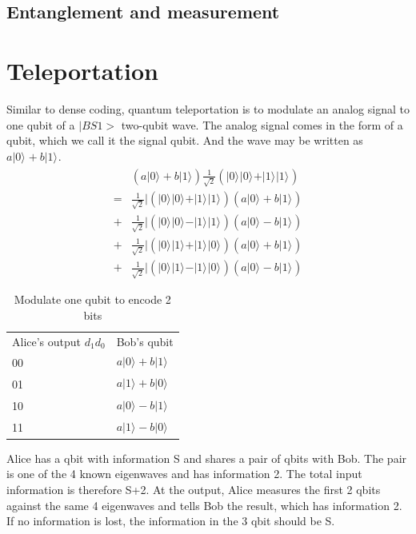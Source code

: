 \documentclass{book}
\newcommand{\keta}[2][]{\vert {#2} \rangle_{#1}}
\begin{document}
\subsection{Entanglement and measurement}

\section{Teleportation}
Similar to dense coding, quantum teleportation is to modulate an analog signal to one qubit of a $|BS1>$ two-qubit wave. The analog signal comes in the form of a qubit, which we call it the signal qubit. And the wave may be written as $a \keta{0} + b\keta{1}$.
\begin{equation}\label{}
\begin{array}{rl}
    & (a \keta{0} + b\keta{1}) \frac 1 {\sqrt 2}(\keta{0}\keta{0}+\keta{1}\keta{1}) \\
    = & \frac 1 {\sqrt 2}| (\keta{0}\keta{0}+\keta{1}\keta{1}) (a \keta{0} + b\keta{1}) \\
    +& \frac 1 {\sqrt 2}| (\keta{0}\keta{0}-\keta{1}\keta{1}) (a \keta{0} - b\keta{1}) \\
    +& \frac 1 {\sqrt 2}| (\keta{0}\keta{1}+\keta{1}\keta{0}) (a \keta{0} + b\keta{1}) \\
    +& \frac 1 {\sqrt 2}| (\keta{0}\keta{1}-\keta{1}\keta{0}) (a \keta{0} - b\keta{1})
\end{array}
\end{equation}

\begin{table}[]
\caption{Modulate one qubit to encode 2 bits}
\label{TeleportationTable}
\begin{tabular}{ll}
Alice's output $d_1 d_0$ & Bob's qubit  \\
00 & $a\keta{0}+b\keta{1}$ \\
01 & $a\keta{1}+b\keta{0}$ \\
10 & $a\keta{0}-b\keta{1}$  \\
11 & $a\keta{1}-b\keta{0}$ 
\end{tabular}
\end{table}

Alice has a qbit with information S and shares a pair of qbits with Bob. The pair is one of the 4 known eigenwaves and has information 2. The total input information is therefore S+2. At the output, Alice measures the first 2 qbits against the same 4 eigenwaves and tells Bob the result, which has information 2. If no information is lost, the information in the 3 qbit should be S.
\end{document}
